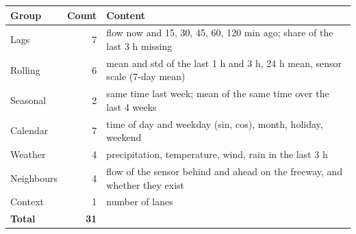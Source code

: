 \begin{tabular}{lrp{9.2cm}}
\toprule
Group & Count & Content \\
\midrule
Lags & 7 & flow now and 15, 30, 45, 60, 120 min ago; share of the last 3 h missing \\
Rolling & 6 & mean and std of the last 1 h and 3 h, 24 h mean, sensor scale (7-day mean) \\
Seasonal & 2 & same time last week; mean of the same time over the last 4 weeks \\
Calendar & 7 & time of day and weekday (sin, cos), month, holiday, weekend \\
Weather & 4 & precipitation, temperature, wind, rain in the last 3 h \\
Neighbours & 4 & flow of the sensor behind and ahead on the freeway, and whether they exist \\
Context & 1 & number of lanes \\
\textbf{Total} & \textbf{31} &  \\
\bottomrule
\end{tabular}
